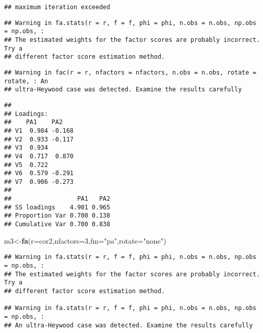 \documentclass[
]{article}
\newenvironment{Shaded}{\begin{snugshade}}{\end{snugshade}}
\newcommand{\DataTypeTok}[1]{\textcolor[rgb]{0.13,0.29,0.53}{#1}}
\newcommand{\DecValTok}[1]{\textcolor[rgb]{0.00,0.00,0.81}{#1}}
\newcommand{\KeywordTok}[1]{\textcolor[rgb]{0.13,0.29,0.53}{\textbf{#1}}}
\newcommand{\NormalTok}[1]{#1}
\newcommand{\OperatorTok}[1]{\textcolor[rgb]{0.81,0.36,0.00}{\textbf{#1}}}
\newcommand{\StringTok}[1]{\textcolor[rgb]{0.31,0.60,0.02}{#1}}
\begin{document}
\begin{verbatim}
## maximum iteration exceeded
\end{verbatim}

\begin{verbatim}
## Warning in fa.stats(r = r, f = f, phi = phi, n.obs = n.obs, np.obs = np.obs, :
## The estimated weights for the factor scores are probably incorrect. Try a
## different factor score estimation method.
\end{verbatim}

\begin{verbatim}
## Warning in fac(r = r, nfactors = nfactors, n.obs = n.obs, rotate = rotate, : An
## ultra-Heywood case was detected. Examine the results carefully
\end{verbatim}

\begin{Shaded}
\end{Shaded}

\begin{verbatim}
## 
## Loadings:
##    PA1    PA2   
## V1  0.984 -0.168
## V2  0.933 -0.117
## V3  0.934       
## V4  0.717  0.870
## V5  0.722       
## V6  0.579 -0.291
## V7  0.906 -0.273
## 
##                  PA1   PA2
## SS loadings    4.901 0.965
## Proportion Var 0.700 0.138
## Cumulative Var 0.700 0.838
\end{verbatim}

\begin{Shaded}
\begin{Highlighting}[]
\NormalTok{m3<-}\KeywordTok{fa}\NormalTok{(}\DataTypeTok{r=}\NormalTok{cor2,}\DataTypeTok{nfactors=}\DecValTok{3}\NormalTok{,}\DataTypeTok{fm=}\StringTok{"pa"}\NormalTok{,}\DataTypeTok{rotate=}\StringTok{"none"}\NormalTok{)}
\end{Highlighting}
\end{Shaded}

\begin{verbatim}
## Warning in fa.stats(r = r, f = f, phi = phi, n.obs = n.obs, np.obs = np.obs, :
## The estimated weights for the factor scores are probably incorrect. Try a
## different factor score estimation method.

## Warning in fa.stats(r = r, f = f, phi = phi, n.obs = n.obs, np.obs = np.obs, :
## An ultra-Heywood case was detected. Examine the results carefully
\end{verbatim}
\end{document}
